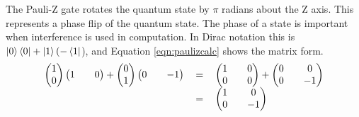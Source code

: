 The Pauli-Z gate rotates the quantum state by $\pi$ radians about the Z axis.
This represents a phase flip of the quantum state.
The phase of a state is important when interference is used in computation.
In Dirac notation this is $\left\vert{0}\right\rangle\left\langle{0}\right\vert + \left\vert{1}\right\rangle(-\left\langle{1}\right\vert$), and Equation \ref{eqn:paulizcalc} shows the matrix form.
\begin{equation}
\label{eqn:paulizcalc}
\begin{tabular}{ r c l }
\(\begin {pmatrix}
1\\
0
\end{pmatrix}
\begin {pmatrix}
1&&
0
\end{pmatrix}
 + 
\begin {pmatrix}
0\\
1
\end{pmatrix}
\begin {pmatrix}
0&&
-1
\end{pmatrix}\)
& \(=\)
& \( 
\begin{pmatrix}
1 && 0 \\
0 && 0
\end{pmatrix}
 + 
\begin{pmatrix}
0 && 0\\
0 && -1
\end{pmatrix}
\) \\
& \(=\)
& \( 
\begin{pmatrix}
1 && 0 \\
0 && -1
\end{pmatrix}
\)
\end{tabular}
\end{equation}

